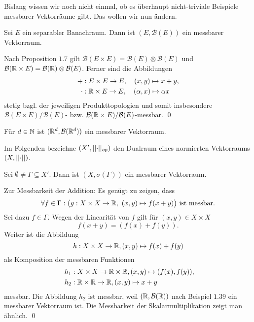 Bislang wissen wir noch nicht einmal, ob es überhaupt nicht-triviale Beispiele messbarer Vektorräume gibt. Das wollen wir nun ändern.  
\begin{proposition}
    Sei $E$ ein separabler Banachraum. Dann ist $(E, \mathcal{B}(E))$ ein messbarer Vektorraum.
\end{proposition}
\begin{proof*}
    Nach Proposition $1.7$ gilt $\mathcal{B}(E \times E) = \mathcal{B}(E) \otimes \mathcal{B}(E)$ und 
    $\mathcal{B}(\mathbb{R} \times E) = \mathcal{B}(\mathbb{R}) \otimes \mathcal{B}(E)$. Ferner sind die Abbildungen 
    \begin{align*}
        + &: E \times E \to E, \quad (x,y) \mapsto x + y, \\\
        \cdot &: \mathbb{R} \times E \to E, \quad (\alpha, x) \mapsto \alpha  x
    \end{align*}
    stetig bzgl. der jeweiligen Produkttopologien und somit insbesondere $\mathcal{B}(E \times E)/\mathcal{B}(E)$- bzw. 
    $\mathcal{B}(\mathbb{R} \times E)/\mathcal{B}(E)$-messbar. \qed
\end{proof*}

\begin{example}
    Für $d \in \mathbb{N}$ ist $(\mathbb{R}^d, \mathcal{B}(\mathbb{R}^d))$ ein messbarer Vektorraum. 
\end{example}

Im Folgenden bezeichne $(X', \lvert\lvert \cdot \rvert\rvert_{op})$ den Dualraum eines normierten Vektorraums $(X, \lvert\lvert \cdot \rvert\rvert)$.

\begin{proposition}
    Sei $\emptyset \neq \Gamma \subseteq X'$. Dann ist $(X, \sigma({\Gamma}))$ ein messbarer Vektorraum. 
\end{proposition}

\begin{proof*}%
    Zur Messbarkeit der Addition: Es genügt zu zeigen, dass 
    $$
        \forall f \in \Gamma : \big(g: X \times X \to \mathbb{R}, \ (x,y) \mapsto f(x+y)\big) \text{ ist messbar.}
    $$
    Sei dazu $f \in \Gamma$. Wegen der Linearität von $f$ gilt für $(x,y) \in X \times X$
    $$
        f(x + y) = (f(x) + f(y)).
    $$
    Weiter ist die Abbildung 
    $$
        h: X \times X \to \mathbb{R}, (x,y) \mapsto f(x) + f(y)
    $$
    als Komposition der messbaren Funktionen 
    \begin{align*}
        &h_1: X \times X \to \mathbb{R} \times \mathbb{R}, (x,y) \mapsto (f(x),f(y)), \\\
        &h_2: \mathbb{R} \times \mathbb{R} \to \mathbb{R}, (x,y) \mapsto x+y
    \end{align*}
    messbar. Die Abbildung $h_2$ ist messbar, weil $(\mathbb{R}, \mathcal{B}(\mathbb{R}))$ nach Beispiel $1.39$ ein messbarer Vektorraum ist. 
    Die Messbarkeit der Skalarmultiplikation zeigt man ähnlich. \qed 
\end{proof*}

